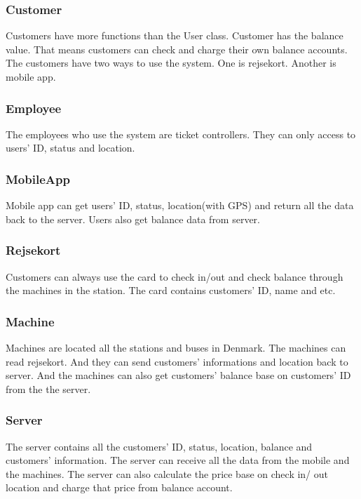 \subsubsection{Customer}
Customers have more functions than the User class. Customer has the balance value. That means customers can check and charge their own balance accounts. The customers have two ways to use the system. One is rejsekort. Another is mobile app.

\subsubsection{Employee}
The employees who use the system are ticket controllers. They can only access to users’ ID, status and location.

\subsubsection{MobileApp}
Mobile app can get users’ ID, status, location(with GPS) and return all the data back to the server. Users also get balance data from server.

\subsubsection{Rejsekort}
Customers can always use the card to check in/out and check balance through the machines in the station. The card contains customers’ ID, name and etc.

\subsubsection{Machine}
Machines are located all the stations and buses in Denmark. The machines can read rejsekort. And they can send customers’ informations and location back to server. And the machines can also get customers’ balance base on customers’ ID from the the server.

\subsubsection{Server}
The server contains all the customers’ ID, status, location, balance and customers’ information. The server can receive all the data from the mobile and the machines. The server can also calculate the price base on check in/ out location and charge that price from balance account. 